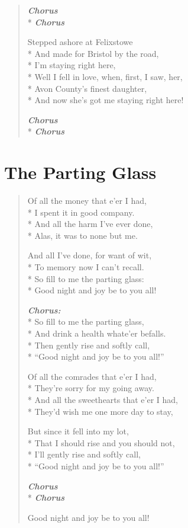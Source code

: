 \documentclass[9pt,twoside]{extarticle}
\makeatletter
\newenvironment{xverse}{
	\begin{verse}
	\fontsize{8.5}{10.5}\selectfont
}{
	\end{verse}
}
\newcommand{\chorusdef}{\textbf{\emph{Chorus:}}\\*}
\newcommand{\chorus@mark}[1][1]{%
\textbf{\emph{Chorus \ifthenelse{\equal{#1}{1}}{}{$\times$ #1}}}%
}
\newcommand{\chorusmark}[1][1]{%
\ifvmode%
\vspace{-0.5\stanzaskip}%
\chorus@mark[#1]%
\vspace{-0.5\stanzaskip}%
\else \\*%
\chorus@mark[#1]%
\fi%
}
\makeatother
\begin{document}
\begin{xverse}
\chorusmark

Stepped ashore at Felixstowe \\*
And made for Bristol by the road, \\*
I’m staying right here, \\*
Well I fell in love, when, first, I saw, her, \\*
Avon County’s finest daughter, \\*
And now she’s got me staying right here!

\chorusmark[2]
\end{xverse}

\section{The Parting Glass}

\begin{xverse}
Of all the money that e’er I had, \\*
I spent it in good company. \\*
And all the harm I’ve ever done, \\*
Alas, it was to none but me.

And all I’ve done, for want of wit, \\*
To memory now I can’t recall. \\*
So fill to me the parting glass: \\*
Good night and joy be to you all!

\chorusdef
So fill to me the parting glass, \\*
And drink a health whate’er befalls. \\*
Then gently rise and softly call, \\*
“Good night and joy be to you all!”

Of all the comrades that e’er I had, \\*
They’re sorry for my going away. \\*
And all the sweethearts that e’er I had, \\*
They’d wish me one more day to stay,

But since it fell into my lot, \\*
That I should rise and you should not, \\*
I’ll gently rise and softly call, \\*
“Good night and joy be to you all!”

\chorusmark

Good night and joy be to you all!
\end{xverse}
\end{document}
